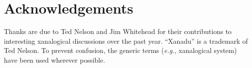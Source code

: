 \documentclass{acm_proc_article-sp}
\begin{document}
\section{Acknowledgements}
Thanks are due to Ted Nelson and Jim Whitehead for their contributions to interesting xanalogical discussions over the past year. ``Xanadu'' is a trademark of Ted Nelson.  To prevent confusion, the generic terms (\textit{e.g.}, xanalogical system) have been used wherever possible.



\end{document}
